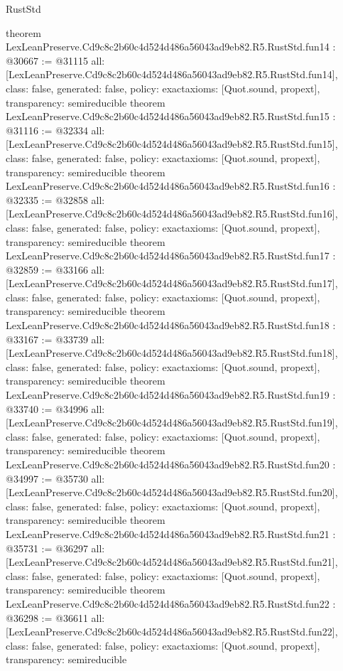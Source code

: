 \begin{lexlean}{RustStd}
\begin{coremodule}
{}
theorem LexLeanPreserve.Cd9c8c2b60c4d524d486a56043ad9eb82.R5.RustStd.fun14 : @30667 := @31115 {
  all: [LexLeanPreserve.Cd9c8c2b60c4d524d486a56043ad9eb82.R5.RustStd.fun14],
  class: false,
  generated: false,
  policy: exact{axioms: [Quot.sound, propext]},
  transparency: semireducible
}
theorem LexLeanPreserve.Cd9c8c2b60c4d524d486a56043ad9eb82.R5.RustStd.fun15 : @31116 := @32334 {
  all: [LexLeanPreserve.Cd9c8c2b60c4d524d486a56043ad9eb82.R5.RustStd.fun15],
  class: false,
  generated: false,
  policy: exact{axioms: [Quot.sound, propext]},
  transparency: semireducible
}
theorem LexLeanPreserve.Cd9c8c2b60c4d524d486a56043ad9eb82.R5.RustStd.fun16 : @32335 := @32858 {
  all: [LexLeanPreserve.Cd9c8c2b60c4d524d486a56043ad9eb82.R5.RustStd.fun16],
  class: false,
  generated: false,
  policy: exact{axioms: [Quot.sound, propext]},
  transparency: semireducible
}
theorem LexLeanPreserve.Cd9c8c2b60c4d524d486a56043ad9eb82.R5.RustStd.fun17 : @32859 := @33166 {
  all: [LexLeanPreserve.Cd9c8c2b60c4d524d486a56043ad9eb82.R5.RustStd.fun17],
  class: false,
  generated: false,
  policy: exact{axioms: [Quot.sound, propext]},
  transparency: semireducible
}
theorem LexLeanPreserve.Cd9c8c2b60c4d524d486a56043ad9eb82.R5.RustStd.fun18 : @33167 := @33739 {
  all: [LexLeanPreserve.Cd9c8c2b60c4d524d486a56043ad9eb82.R5.RustStd.fun18],
  class: false,
  generated: false,
  policy: exact{axioms: [Quot.sound, propext]},
  transparency: semireducible
}
theorem LexLeanPreserve.Cd9c8c2b60c4d524d486a56043ad9eb82.R5.RustStd.fun19 : @33740 := @34996 {
  all: [LexLeanPreserve.Cd9c8c2b60c4d524d486a56043ad9eb82.R5.RustStd.fun19],
  class: false,
  generated: false,
  policy: exact{axioms: [Quot.sound, propext]},
  transparency: semireducible
}
theorem LexLeanPreserve.Cd9c8c2b60c4d524d486a56043ad9eb82.R5.RustStd.fun20 : @34997 := @35730 {
  all: [LexLeanPreserve.Cd9c8c2b60c4d524d486a56043ad9eb82.R5.RustStd.fun20],
  class: false,
  generated: false,
  policy: exact{axioms: [Quot.sound, propext]},
  transparency: semireducible
}
theorem LexLeanPreserve.Cd9c8c2b60c4d524d486a56043ad9eb82.R5.RustStd.fun21 : @35731 := @36297 {
  all: [LexLeanPreserve.Cd9c8c2b60c4d524d486a56043ad9eb82.R5.RustStd.fun21],
  class: false,
  generated: false,
  policy: exact{axioms: [Quot.sound, propext]},
  transparency: semireducible
}
theorem LexLeanPreserve.Cd9c8c2b60c4d524d486a56043ad9eb82.R5.RustStd.fun22 : @36298 := @36611 {
  all: [LexLeanPreserve.Cd9c8c2b60c4d524d486a56043ad9eb82.R5.RustStd.fun22],
  class: false,
  generated: false,
  policy: exact{axioms: [Quot.sound, propext]},
  transparency: semireducible
}
\end{coremodule}
\end{lexlean}
